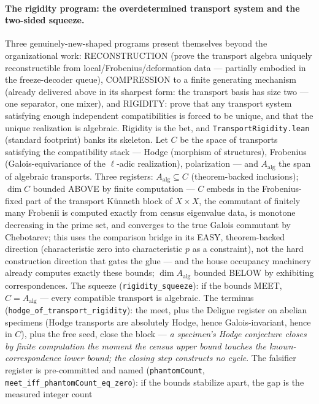 \documentclass[11pt]{article}
\theoremstyle{definition}
\theoremstyle{remark}
\begin{document}
\paragraph{The rigidity program: the overdetermined transport system
and the two-sided squeeze.}  Three genuinely-new-shaped programs
present themselves beyond the organizational work: RECONSTRUCTION
(prove the transport algebra uniquely reconstructible from
local/Frobenius/deformation data --- partially embodied in the
freeze-decoder queue), COMPRESSION to a finite generating mechanism
(already delivered above in its sharpest form: the transport basis
has size two --- one separator, one mixer), and RIGIDITY: prove that
any transport system satisfying enough independent compatibilities is
forced to be unique, and that the unique realization is algebraic.
Rigidity is the bet, and \texttt{TransportRigidity.lean} (standard
footprint) banks its skeleton.  Let $C$ be the space of transports
satisfying the compatibility stack --- Hodge (morphism of structures),
Frobenius (Galois-equivariance of the $\ell$-adic realization),
polarization --- and $A_{\mathrm{alg}}$ the span of algebraic
transports.  Three registers: $A_{\mathrm{alg}}\subseteq C$
(theorem-backed inclusions); $\dim C$ bounded ABOVE by finite
computation --- $C$ embeds in the Frobenius-fixed part of the
transport K\"unneth block of $X\times X$, the commutant of finitely
many Frobenii is computed exactly from census eigenvalue data, is
monotone decreasing in the prime set, and converges to the true
Galois commutant by Chebotarev; this uses the comparison bridge in
its EASY, theorem-backed direction (characteristic zero into
characteristic $p$ as a constraint), not the hard construction
direction that gates the glue --- and the house occupancy machinery
already computes exactly these bounds; $\dim A_{\mathrm{alg}}$
bounded BELOW by exhibiting correspondences.  The squeeze
(\texttt{rigidity\_squeeze}): if the bounds MEET, $C=A_{\mathrm{alg}}$
--- every compatible transport is algebraic.  The terminus
(\texttt{hodge\_of\_transport\_rigidity}): the meet, plus the Deligne
register on abelian specimens (Hodge transports are absolutely Hodge,
hence Galois-invariant, hence in $C$), plus the free seed, close the
block --- \emph{a specimen's Hodge conjecture closes by finite
computation the moment the census upper bound touches the
known-correspondence lower bound; the closing step constructs no
cycle}.  The falsifier register is pre-committed and named
(\texttt{phantomCount}, \texttt{meet\_iff\_phantomCount\_eq\_zero}):
if the bounds stabilize apart, the gap is the measured integer count
\end{document}
